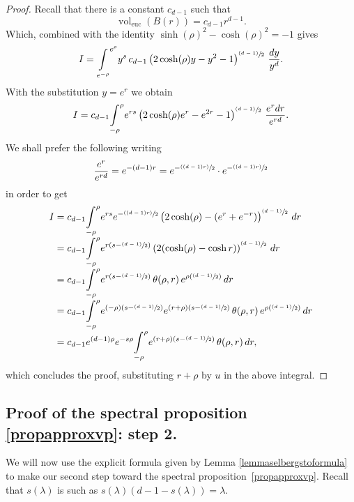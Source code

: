 \documentclass[10pt]{amsart}
\newcommand{\psfrac}[2]{\sfrac{(#1)}{#2}}
\theoremstyle{plain}
\theoremstyle{definition}
\newcommand{\inte}[1]{\underset{#1}{\int}}
\DeclareMathOperator{\vol}{vol}
\begin{document}
\begin{proof}
Recall that there is a constant $c_{d-1}$ such that\vspace*{-3pt}
\[
\vol_{\text{euc}} \left(B(r) \right) = c_{d-1} r^{d-1}.
\]
Which, combined with the identity $\sinh(\rho)^2 - \cosh(\rho)^2 = -1$ gives\vspace*{-3pt}
\[
I = \inte{e^{-\rho}}^{e^{\rho}} y^s \, c_{d-1} \left(2 \cosh(\rho)y - y^2 - 1 \right)^{\psfrac{d-1}{2}} \, \frac{dy}{y^d}.
\]
With the substitution $y = e^r$ we obtain\vspace*{-3pt}
\[
I = c_{d-1} \inte{-\rho}^{\rho} e^{rs} \left(2 \cosh(\rho)e^r - e^{2r} - 1 \right)^{\psfrac{d-1}{2}} \, \frac{e^{r}dr}{e^{rd}}.
\]
We shall prefer the following writing\vspace*{-3pt}
\[
\frac{e^{r}}{e^{rd}} = e^{-(d-1)r} = e^{-\psfrac{(d-1)r}{2}} \cdot e^{-\psfrac{(d-1)r}{2}}
\]
in order to get\vspace*{-3pt}
\begin{align*}
I & = c_{d-1} \inte{-\rho}^{\rho} e^{rs} e^{-\psfrac{(d-1)r}{2}} \left(2 \cosh(\rho) - (e^{r} + e^{-r}) \right)^{\psfrac{d-1}{2}} \,dr \\[-3pt]
& = c_{d-1} \inte{-\rho}^{\rho} e^{r \left(s- \psfrac{d-1}{2} \right)} \left(2 (\cosh(\rho) - \cosh{r}) \right)^{\psfrac{d-1}{2}} \,dr \\[-3pt]
& = c_{d-1} \inte{-\rho}^{\rho} e^{r \left(s- \psfrac{d-1}{2} \right)} \,\theta(\rho,r) \, e^{\rho \left(\psfrac{d-1}{2} \right)} \,dr \\[-3pt]
& = c_{d-1} \inte{-\rho}^{\rho} e^{(-\rho) \left(s- \psfrac{d-1}{2} \right)} e^{(r + \rho) \left(s- \psfrac{d-1}{2} \right)} \,\theta(\rho,r) \, e^{\rho \left(\psfrac{d-1}{2} \right) } \,dr \\[-3pt]
& = c_{d-1} e^{(d-1)\rho} e^{ -s \rho} \inte{-\rho}^{\rho} e^{(r + \rho) \left(s- \psfrac{d-1}{2} \right)} \,\theta(\rho,r) \,dr,
\end{align*}
which concludes the proof, substituting $r + \rho$ by $ u$ in the above integral.
\end{proof}

\subsection{Proof of the spectral proposition \ref{propapproxvp}: step 2.}
We will now use the explicit formula given by Lemma \ref{lemmaselbergstoformula} to make our second step toward the spectral proposition~\ref{propapproxvp}. Recall that $s(\lambda)$ is such as $s(\lambda)(d-1-s(\lambda)) = \lambda$.
\end{document}
